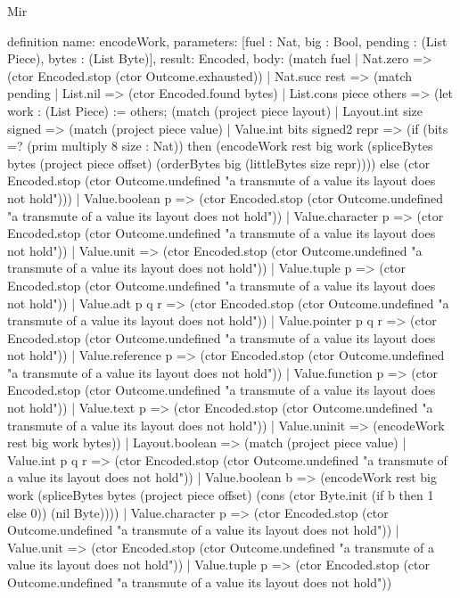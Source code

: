 \begin{lexlean}{Mir}
\begin{semanticmodule}
definition{
  name: encodeWork,
  parameters: [fuel : Nat, big : Bool, pending : (List Piece), bytes : (List Byte)],
  result: Encoded,
  body: (match fuel
    | Nat.zero => (ctor Encoded.stop (ctor Outcome.exhausted))
    | Nat.succ rest => (match pending
      | List.nil => (ctor Encoded.found bytes)
      | List.cons piece others => (let work : (List Piece) := others; (match (project piece layout)
        | Layout.int size signed => (match (project piece value)
          | Value.int bits signed2 repr => (if (bits =? (prim multiply 8 size : Nat)) then (encodeWork rest big work (spliceBytes bytes (project piece offset) (orderBytes big (littleBytes size repr)))) else (ctor Encoded.stop (ctor Outcome.undefined "a transmute of a value its layout does not hold")))
          | Value.boolean p => (ctor Encoded.stop (ctor Outcome.undefined "a transmute of a value its layout does not hold"))
          | Value.character p => (ctor Encoded.stop (ctor Outcome.undefined "a transmute of a value its layout does not hold"))
          | Value.unit => (ctor Encoded.stop (ctor Outcome.undefined "a transmute of a value its layout does not hold"))
          | Value.tuple p => (ctor Encoded.stop (ctor Outcome.undefined "a transmute of a value its layout does not hold"))
          | Value.adt p q r => (ctor Encoded.stop (ctor Outcome.undefined "a transmute of a value its layout does not hold"))
          | Value.pointer p q r => (ctor Encoded.stop (ctor Outcome.undefined "a transmute of a value its layout does not hold"))
          | Value.reference p => (ctor Encoded.stop (ctor Outcome.undefined "a transmute of a value its layout does not hold"))
          | Value.function p => (ctor Encoded.stop (ctor Outcome.undefined "a transmute of a value its layout does not hold"))
          | Value.text p => (ctor Encoded.stop (ctor Outcome.undefined "a transmute of a value its layout does not hold"))
          | Value.uninit => (encodeWork rest big work bytes))
        | Layout.boolean => (match (project piece value)
          | Value.int p q r => (ctor Encoded.stop (ctor Outcome.undefined "a transmute of a value its layout does not hold"))
          | Value.boolean b => (encodeWork rest big work (spliceBytes bytes (project piece offset) (cons (ctor Byte.init (if b then 1 else 0)) (nil Byte))))
          | Value.character p => (ctor Encoded.stop (ctor Outcome.undefined "a transmute of a value its layout does not hold"))
          | Value.unit => (ctor Encoded.stop (ctor Outcome.undefined "a transmute of a value its layout does not hold"))
          | Value.tuple p => (ctor Encoded.stop (ctor Outcome.undefined "a transmute of a value its layout does not hold"))
}
\end{semanticmodule}
\end{lexlean}
